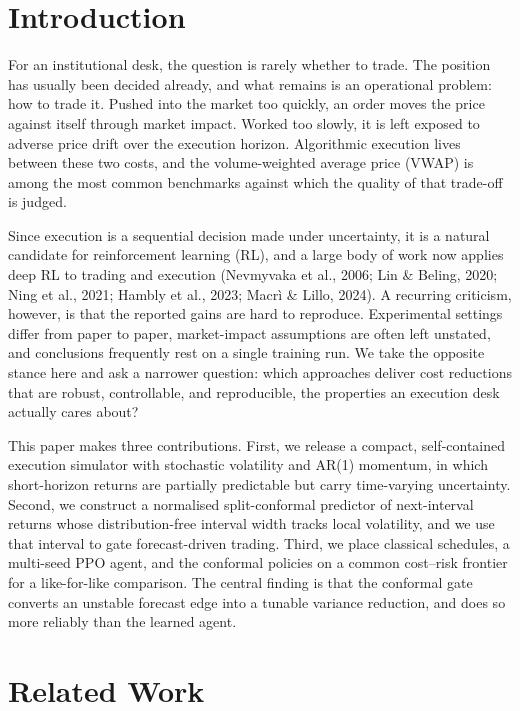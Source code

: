 \section{Introduction}

For an institutional desk, the question is rarely whether to trade. The
position has usually been decided already, and what remains is an
operational problem: how to trade it. Pushed into the market too
quickly, an order moves the price against itself through market impact.
Worked too slowly, it is left exposed to adverse price drift over the
execution horizon. Algorithmic execution lives between these two costs,
and the volume-weighted average price (VWAP) is among the most common
benchmarks against which the quality of that trade-off is judged.

Since execution is a sequential decision made under uncertainty, it is a
natural candidate for reinforcement learning (RL), and a large body of
work now applies deep RL to trading and execution (Nevmyvaka et al.,
2006; Lin \& Beling, 2020; Ning et al., 2021; Hambly et al., 2023; Macrì
\& Lillo, 2024). A recurring criticism, however, is that the reported
gains are hard to reproduce. Experimental settings differ from paper to
paper, market-impact assumptions are often left unstated, and
conclusions frequently rest on a single training run. We take the
opposite stance here and ask a narrower question: which approaches
deliver cost reductions that are robust, controllable, and reproducible,
the properties an execution desk actually cares about?

This paper makes three contributions. First, we release a compact,
self-contained execution simulator with stochastic volatility and AR(1)
momentum, in which short-horizon returns are partially predictable but
carry time-varying uncertainty. Second, we construct a normalised
split-conformal predictor of next-interval returns whose
distribution-free interval width tracks local volatility, and we use
that interval to gate forecast-driven trading. Third, we place classical
schedules, a multi-seed PPO agent, and the conformal policies on a
common cost--risk frontier for a like-for-like comparison. The central
finding is that the conformal gate converts an unstable forecast edge
into a tunable variance reduction, and does so more reliably than the
learned agent.

\section{Related Work}


